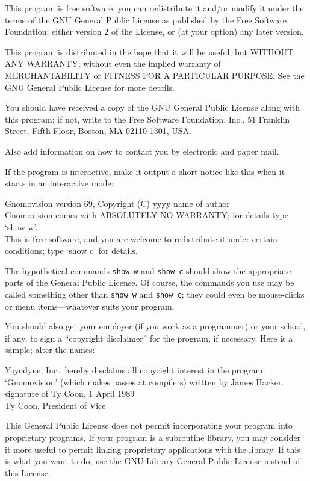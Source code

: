 \begin{lrbox}{\gpl}
\begin{minipage}{3\textwidth}
  This program is free software; you can redistribute it and/or modify
  it under the terms of the GNU General Public License as published by
  the Free Software Foundation; either version 2 of the License, or
  (at your option) any later version.

  This program is distributed in the hope that it will be useful,
  but WITHOUT ANY WARRANTY; without even the implied warranty of
  MERCHANTABILITY or FITNESS FOR A PARTICULAR PURPOSE.  See the
  GNU General Public License for more details.

  You should have received a copy of the GNU General Public License
  along with this program; if not, write to the Free Software
  Foundation, Inc., 51 Franklin Street, Fifth Floor, Boston, MA  02110-1301, USA.
\endnarrower

Also add information on how to contact you by electronic and paper mail.

If the program is interactive, make it output a short notice like this
when it starts in an interactive mode:

\beginnarrower
  Gnomovision version 69, Copyright (C) yyyy  name of author \\
  Gnomovision comes with ABSOLUTELY NO WARRANTY; for details type `show w'. \\
  This is free software, and you are welcome to redistribute it
  under certain conditions; type `show c' for details.
\endnarrower


The hypothetical commands {\tt show w} and {\tt show c} should show the
appropriate parts of the General Public License.  Of course, the commands
you use may be called something other than {\tt show w} and {\tt show c};
they could even be mouse-clicks or menu items---whatever suits your
program.

You should also get your employer (if you work as a programmer) or your
school, if any, to sign a ``copyright disclaimer'' for the program, if
necessary.  Here is a sample; alter the names:

\beginnarrower
Yoyodyne, Inc., hereby disclaims all copyright interest in the program \\
`Gnomovision' (which makes passes at compilers) written by James Hacker. \\

signature of Ty Coon, 1 April 1989 \\
Ty Coon, President of Vice
\endnarrower


This General Public License does not permit incorporating your program
into proprietary programs.  If your program is a subroutine library, you
may consider it more useful to permit linking proprietary applications
with the library.  If this is what you want to do, use the GNU Library
General Public License instead of this License.

\endtriplecolumns
\end{minipage}
\end{lrbox}

\begincentered
  \scalebox{0.33}{\usebox{\gpl}}
\endcentered

\endsection

\endinput

